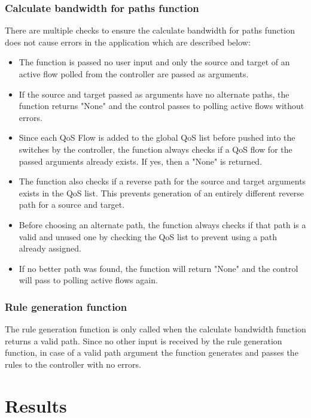 \documentclass[paper=a4, fontsize=12pt]{scrartcl}	%
\numberwithin{equation}{section}		%
\numberwithin{figure}{section}			%
\numberwithin{table}{section}				%
\begin{document}
\subsubsection{Calculate bandwidth for paths function}
There are multiple checks to ensure the calculate bandwidth for paths function does not cause errors in the application which are described below:
\begin{itemize}
\item The function is passed no user input and only the source and target of an active flow polled from the controller are passed as arguments.
\item If the source and target passed as arguments have no alternate paths, the function returns "None" and the control passes to polling active flows without errors.
\item Since each QoS Flow is added to the global QoS list before pushed into the switches by the controller, the function always checks if a QoS flow for the passed arguments already exists. If yes, then a "None" is returned.
\item The function also checks if a reverse path for the source and target arguments exists in the QoS list. This prevents generation of an entirely different reverse path for a source and target. 
\item Before choosing an alternate path, the function always checks if that path is a valid and unused one by checking the QoS list to prevent using a path already assigned.
\item If no better path was found, the function will return "None" and the control will pass to polling active flows again.
\end{itemize}

\subsubsection{Rule generation function}
The rule generation function is only called when the calculate bandwidth function returns a valid path. Since no other input is received by the rule generation function, in case of a valid path argument the function generates and passes the rules to the controller with no errors.

\section{Results}
\end{document}
